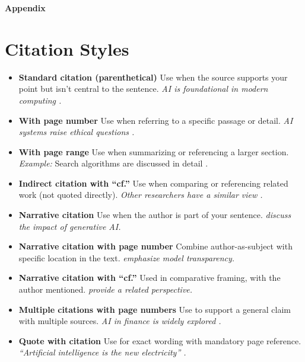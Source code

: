 {\sloppy
\printbibliography
\fussy}

\clearpage
\appendix
{}
{}
\begin{center}
\huge\bfseries Appendix
\end{center}

\section*{Citation Styles} \label{app:citation}
\begin{itemize}
    \item \textbf{Standard citation (parenthetical)} Use when the source supports your point but isn't central to the sentence. \textit{AI is foundational in modern computing \parencite{Rodriguez_Agents_2025}.}
    \item \textbf{With page number} Use when referring to a specific passage or detail. \textit{AI systems raise ethical questions \parencite[p.~45]{Rodriguez_Agents_2025}.}
    \item \textbf{With page range} Use when summarizing or referencing a larger section. \textit{Example:} Search algorithms are discussed in detail \parencite[pp.~15--24]{Rodriguez_Agents_2025}.
    \item \textbf{Indirect citation with ``cf.''} Use when comparing or referencing related work (not quoted directly). \textit{Other researchers have a similar view \parencite[cf.][p.~112]{Rodriguez_Agents_2025}.}
    \item \textbf{Narrative citation} Use when the author is part of your sentence. \textit{\textcite{Rodriguez_Agents_2025} discuss the impact of generative AI.}
    \item \textbf{Narrative citation with page number} Combine author-as-subject with specific location in the text. \textit{\textcite[p.~112]{Rodriguez_Agents_2025} emphasize model transparency.}
    \item \textbf{Narrative citation with ``cf.''} Used in comparative framing, with the author mentioned. \textit{\textcite[cf.][p.~112]{Rodriguez_Agents_2025} provide a related perspective.}
    \item \textbf{Multiple citations with page numbers} Use to support a general claim with multiple sources. \textit{AI in finance is widely explored
    \parencites
      [pp.~15--17]{Rodriguez_Agents_2025}
      [p.~112]{Rodriguez_Agents_2025}.}
    \item \textbf{Quote with citation} Use for exact wording with mandatory page reference. \textit{``Artificial intelligence is the new electricity'' \parencite[p.~7]{Rodriguez_Agents_2025}.}
\end{itemize}

